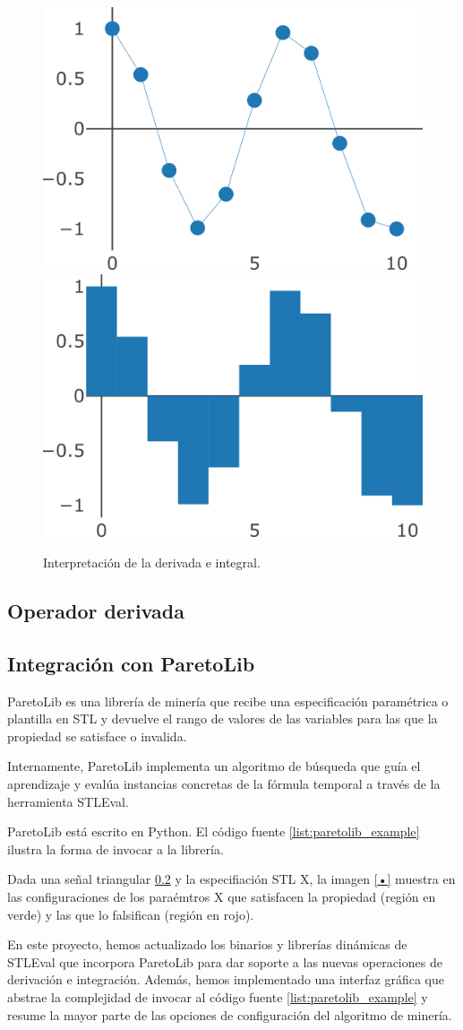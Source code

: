 \begin{figure}
\centering
  \includegraphics[width=.4\linewidth]{images/derivada} \hfill
  \includegraphics[width=.4\linewidth]{images/integral}
\caption{Interpretación de la derivada e integral.}
\label{fig:der_int}
\end{figure}


\subsection{Operador derivada}



\subsection{Integración con ParetoLib}
ParetoLib \cite{FORMATS_19, ParetoLib} es una librería de minería que recibe una especificación paramétrica o plantilla en STL y devuelve el rango de valores de las variables para las que la propiedad se satisface o invalida. 

Internamente, ParetoLib implementa un algoritmo de búsqueda que guía el aprendizaje y evalúa instancias concretas de la fórmula temporal a través de la herramienta STLEval.

ParetoLib está escrito en Python. El código fuente \ref{list:paretolib_example} ilustra la forma de invocar a la librería.

Dada una señal triangular \ref{} y la especifiación STL X, la imagen \ref{•} muestra en las configuraciones de los paraémtros X que satisfacen la propiedad (región en verde) y las que lo falsifican (región en rojo).

En este proyecto, hemos actualizado los binarios y librerías dinámicas de STLEval que incorpora ParetoLib para dar soporte a las nuevas operaciones de derivación e integración. Además, hemos implementado una interfaz gráfica que abstrae la complejidad de invocar al código fuente \ref{list:paretolib_example} y resume la mayor parte de las opciones de configuración del algoritmo de minería.

